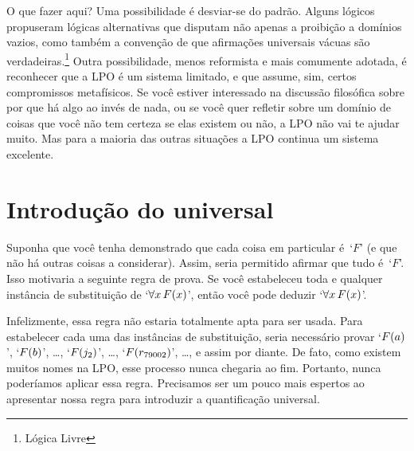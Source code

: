 O que fazer aqui? Uma possibilidade é desviar-se do padrão. Alguns lógicos propuseram lógicas alternativas que disputam não apenas a proibição a domínios vazios, como também a convenção de que afirmações universais vácuas são verdadeiras.\footnote{Lógica Livre}  Outra possibilidade, menos reformista e mais comumente adotada, é reconhecer que a LPO é um sistema limitado, e que assume, sim, certos compromissos metafísicos. Se você estiver interessado na discussão filosófica sobre por que há algo ao invés de nada, ou se você quer refletir sobre um domínio de coisas que você não tem certeza se elas existem ou não, a LPO não vai te ajudar muito. Mas para a maioria das outras situações a LPO continua um sistema excelente.


\section{Introdução do universal}
Suponha que você tenha demonstrado que cada coisa em particular é~`$F$' (e que não há outras coisas a considerar). Assim, seria permitido afirmar que tudo é~`$F$'. Isso motivaria a seguinte regra de prova. Se você estabeleceu toda e qualquer instância de substituição de `$\forall x\,\mathord{F}(x)$', então você pode deduzir `$\forall x\,\mathord{F}(x)$'. 
 
 Infelizmente, essa regra não estaria  totalmente apta para ser usada. Para estabelecer cada uma das instâncias de substituição, seria necessário provar  `$\mathord{F}(a)$', `$\mathord{F}(b)$', \dots, `$\mathord{F}(j_2)$', \dots, `$\mathord{F}(r_{79002})$', \ldots, e assim por diante. De fato, como existem muitos nomes na LPO, esse processo nunca chegaria ao fim. Portanto, nunca poderíamos aplicar essa regra. Precisamos ser um pouco mais espertos ao apresentar nossa regra para introduzir a quantificação universal.
 
